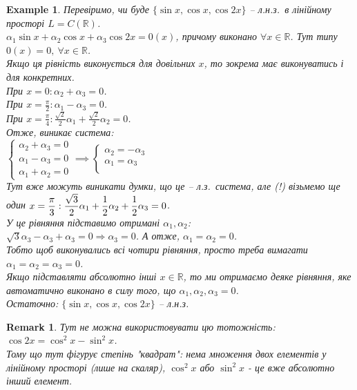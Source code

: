 \documentclass[a4paper, 10pt]{article}
\theoremstyle{theoremdd}
\newtheorem{example}[theorem]{Example}
\newtheorem{remark}[theorem]{Remark}
\begin{document}
	\begin{example}
	Перевіримо, чи буде $\{\sin x, \cos x, \cos 2x\}$ -- л.н.з.\ в лінійному просторі $L = C(\mathbb{R})$.\\
	$\alpha_1 \sin x + \alpha_2 \cos x + \alpha_3 \cos 2x = 0(x)$, причому виконано $\forall x \in \mathbb{R}$. Тут типу $0(x) = 0,\ \forall x \in \mathbb{R}$.\\
	Якщо ця рівність виконується для довільних $x$, то зокрема має виконуватись і для конкретних.\\
	При $\displaystyle x = 0: \alpha_2 + \alpha_3 = 0$.\\
	При $\displaystyle x = \frac{\pi}{2}: \alpha_1 - \alpha_3 = 0$.\\
	При $\displaystyle x = \frac{\pi}{4}: \frac{\sqrt{2}}{2} \alpha_1 + \frac{\sqrt{2}}{2} \alpha_2 = 0$.\\
	Отже, виникає система:\\
	$\begin{cases}
	\alpha_2 + \alpha_3 = 0\\
	\alpha_1 - \alpha_3 = 0\\
	\alpha_1 + \alpha_2 = 0
	\end{cases}
	\implies
	\begin{cases}
	\alpha_2 =  -\alpha_3\\
	\alpha_1 = \alpha_3\\
	\end{cases}
	$\\
	Тут вже можуть виникати думки, що це -- л.з.\ система, але (!) візьмемо ще один $\displaystyle x = \frac{\pi}{3}: \\ \frac{\sqrt{3}}{2}\alpha_1 + \frac{1}{2}\alpha_2 + \frac{1}{2}\alpha_3 = 0$.\\
	У це рівняння підставимо отримані $\alpha_1,\alpha_2$:\\
	$\sqrt{3}\alpha_3 - \alpha_3 + \alpha_3 = 0 \Rightarrow \alpha_3 = 0$. А отже, $\alpha_1 = \alpha_2 = 0$.\\
	Тобто щоб виконувались всі чотири рівняння, просто треба вимагати $\alpha_1 = \alpha_2 = \alpha_3 = 0$.\\
	Якщо підставляти абсолютно інші $x \in \mathbb{R}$, то ми отримаємо деяке рівняння, яке автоматично виконано в силу того, що $\alpha_1,\alpha_2,\alpha_3 = 0$.\\
	Остаточно: $\{\sin x, \cos x, \cos 2x\}$ -- л.н.з.
	\end{example}
	
	\begin{remark}
	Тут не можна використовувати цю тотожність: $\cos 2x = \cos ^2 x - \sin ^2 x$. \\ 
	Тому що тут фігурує степінь "квадрат": нема множення двох елементів у лінійному просторі (лише на скаляр), $\cos^2 x$ або $\sin^2 x$ - це вже абсолютно інший елемент.
	\end{remark}
	
\end{document}
